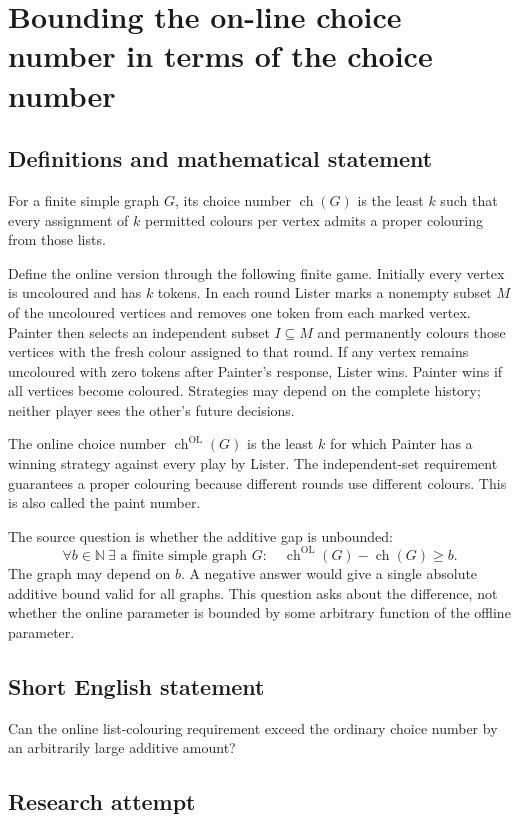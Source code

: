 \documentclass[11pt,a4paper]{article}
\begin{document}
\section*{Bounding the on-line choice number in terms of the choice number}\label{statement}

\subsection{Definitions and mathematical statement}
For a finite simple graph $G$, its choice number $\operatorname{ch}(G)$ is
the least $k$ such that every assignment of $k$ permitted colours per
vertex admits a proper colouring from those lists.

Define the online version through the following finite game. Initially
every vertex is uncoloured and has $k$ tokens. In each round Lister marks
a nonempty subset $M$ of the uncoloured vertices and removes one token
from each marked vertex. Painter then selects an independent subset
$I\subseteq M$ and permanently colours those vertices with the fresh
colour assigned to that round. If any vertex remains uncoloured with
zero tokens after Painter's response, Lister wins. Painter wins if all
vertices become coloured. Strategies may depend on the complete history;
neither player sees the other's future decisions.

The online choice number $\operatorname{ch}^{\mathrm{OL}}(G)$ is the least
$k$ for which Painter has a winning strategy against every play by Lister.
The independent-set requirement guarantees a proper colouring because
different rounds use different colours. This is also called the paint
number.

The source question is whether the additive gap is unbounded:
\[
 \forall b\in\mathbb N\ \exists\text{ a finite simple graph }G:
 \quad\operatorname{ch}^{\mathrm{OL}}(G)-\operatorname{ch}(G)\ge b.
\]
The graph may depend on $b$. A negative answer would give a single
absolute additive bound valid for all graphs. This question asks about
the difference, not whether the online parameter is bounded by some
arbitrary function of the offline parameter.
\subsection{Short English statement}
Can the online list-colouring requirement exceed the ordinary choice number by an arbitrarily large additive amount?
\subsection{Research attempt}
\end{document}
